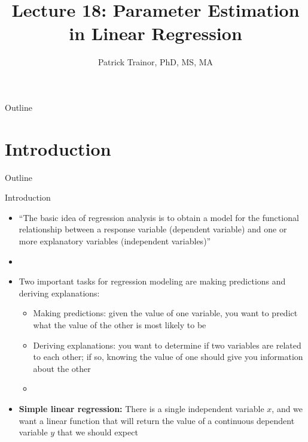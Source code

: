 \documentclass[xcolor=dvipsnames]{beamer}
\title[Lecture 18]{Lecture 18: Parameter Estimation in Linear Regression}
\author[Patrick Trainor]{Patrick Trainor, PhD, MS, MA}
\institute[NMSU]{New Mexico State University}
\date{}
\begin{document}
\begin{frame}
\maketitle
\end{frame}

\begin{frame}{Outline}
\tableofcontents[hideallsubsections]
\end{frame}

\section{Introduction}
\begin{frame}{Outline}
\tableofcontents[currentsection,subsectionstyle=show/shaded/hide]
\end{frame}

\begin{frame}{Introduction}
	\begin{itemize}
		\item ``The basic idea of regression analysis is to obtain a model for the functional relationship between a response variable (dependent variable) and one or more explanatory variables (independent variables)'' \pause
		\item[]
		\item Two important tasks for regression modeling are making predictions and deriving explanations: \pause
		\begin{itemize}
			\item Making predictions: given the value of one variable, you want to predict what the value of the other is most likely to be \pause
			\item Deriving explanations: you want to determine if two variables are related to each other; if so, knowing the value of one should give you information about the other \pause
			\item[]
		\end{itemize}
		\item \textbf{Simple linear regression:} There is a single independent variable $x$, and we want a linear function that will return the value of a continuous dependent variable $y$ that we should expect
	\end{itemize}
\end{frame}
\end{document}

